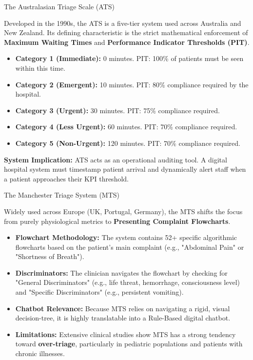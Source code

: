 \documentclass[aspectratio=169]{beamer}
\begin{document}
	\begin{frame}{The Australasian Triage Scale (ATS)}
		
		
		Developed in the 1990s, the ATS is a five-tier system used across Australia and New Zealand. Its defining characteristic is the strict mathematical enforcement of \textbf{Maximum Waiting Times} and \textbf{Performance Indicator Thresholds (PIT)}.
		\vspace{0.2cm}
		\begin{itemize}
			\item \textbf{Category 1 (Immediate):} 0 minutes. PIT: 100\% of patients must be seen within this time.
			\item \textbf{Category 2 (Emergent):} 10 minutes. PIT: 80\% compliance required by the hospital.
			\item \textbf{Category 3 (Urgent):} 30 minutes. PIT: 75\% compliance required.
			\item \textbf{Category 4 (Less Urgent):} 60 minutes. PIT: 70\% compliance required.
			\item \textbf{Category 5 (Non-Urgent):} 120 minutes. PIT: 70\% compliance required.
		\end{itemize}
		\textbf{System Implication:} ATS acts as an operational auditing tool. A digital hospital system must timestamp patient arrival and dynamically alert staff when a patient approaches their KPI threshold.
	\end{frame}
	
	\begin{frame}{The Manchester Triage System (MTS)}
		
		
		Widely used across Europe (UK, Portugal, Germany), the MTS shifts the focus from purely physiological metrics to \textbf{Presenting Complaint Flowcharts}.
		\vspace{0.2cm}
		\begin{itemize}
			\item \textbf{Flowchart Methodology:} The system contains 52+ specific algorithmic flowcharts based on the patient's main complaint (e.g., "Abdominal Pain" or "Shortness of Breath").
			\item \textbf{Discriminators:} The clinician navigates the flowchart by checking for "General Discriminators" (e.g., life threat, hemorrhage, consciousness level) and "Specific Discriminators" (e.g., persistent vomiting).
			\item \textbf{Chatbot Relevance:} Because MTS relies on navigating a rigid, visual decision-tree, it is highly translatable into a Rule-Based digital chatbot.
			\item \textbf{Limitations:} Extensive clinical studies show MTS has a strong tendency toward \textbf{over-triage}, particularly in pediatric populations and patients with chronic illnesses.
		\end{itemize}
	\end{frame}
	
\end{document}
